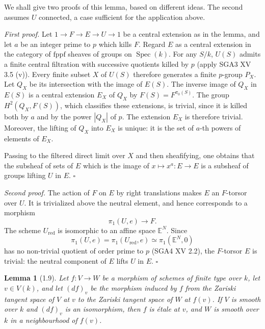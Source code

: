 \documentclass[10pt]{article}
\newcommand{\Spec}{\operatorname{Spec}}
\newcommand{\red}{\mathrm{red}}
\newcommand{\fppf}{\mathrm{fppf}}
\theoremstyle{deligne}
\newtheorem*{lemma*}{Lemma}
\newenvironment{proofone}{\textit{First proof.}}{\hfill$\square$}
\newenvironment{prooftwo}{\textit{Second proof.}}{\hfill$\square$}
\begin{document}
We shall give two proofs of this lemma, based on different ideas. The second assumes \(U\) connected, a case sufficient for the application above.

\begin{proofone}
Let \(1\to F\to E\to U\to1\) be a central extension as in the lemma, and let \(a\) be an integer prime to \(p\) which kills \(F\). Regard \(E\) as a central extension in the category of \(\fppf\) sheaves of groups on \(\Spec(k)\). For any \(S/k\), \(U(S)\) admits a finite central filtration with successive quotients killed by \(p\) (apply SGA3 XV 3.5 (v)). Every finite subset \(X\) of \(U(S)\) therefore generates a finite \(p\)-group \(P_X\). Let \(Q_X\) be its intersection with the image of \(E(S)\). The inverse image of \(Q_X\) in \(E(S)\) is a central extension \(E_X\) of \(Q_X\) by \(F(S)=F^{\pi_0(S)}\). The group \(H^2(Q_X,F(S))\), which classifies these extensions, is trivial, since it is killed both by \(a\) and by the power \(|Q_X|\) of \(p\). The extension \(E_X\) is therefore trivial. Moreover, the lifting of \(Q_X\) into \(E_X\) is unique: it is the set of \(a\)-th powers of elements of \(E_X\).

Passing to the filtered direct limit over \(X\) and then sheafifying, one obtains that the subsheaf of sets of \(E\) which is the image of \(x\mapsto x^a:E\to E\) is a subsheaf of groups lifting \(U\) in \(E\).
\end{proofone}

\begin{prooftwo}
The action of \(F\) on \(E\) by right translations makes \(E\) an \(F\)-torsor over \(U\). It is trivialized above the neutral element, and hence corresponds to a morphism
\[
  \pi_1(U,e)\longrightarrow F.
\]
The scheme \(U_{\red}\) is isomorphic to an affine space \(\mathbb E^N\). Since
\[
  \pi_1(U,e)=\pi_1(U_{\red},e)\simeq\pi_1(\mathbb E^N,0)
\]
has no non-trivial quotient of order prime to \(p\) (SGA4 XV 2.2), the \(F\)-torsor \(E\) is trivial: the neutral component of \(E\) lifts \(U\) in \(E\).
\end{prooftwo}

\begin{lemma*}[1.9]
Let \(f:V\to W\) be a morphism of schemes of finite type over \(k\), let \(v\in V(k)\), and let \((df)_v\) be the morphism induced by \(f\) from the Zariski tangent space of \(V\) at \(v\) to the Zariski tangent space of \(W\) at \(f(v)\). If \(V\) is smooth over \(k\) and \((df)_v\) is an isomorphism, then \(f\) is étale at \(v\), and \(W\) is smooth over \(k\) in a neighbourhood of \(f(v)\).
\end{lemma*}
\end{document}
